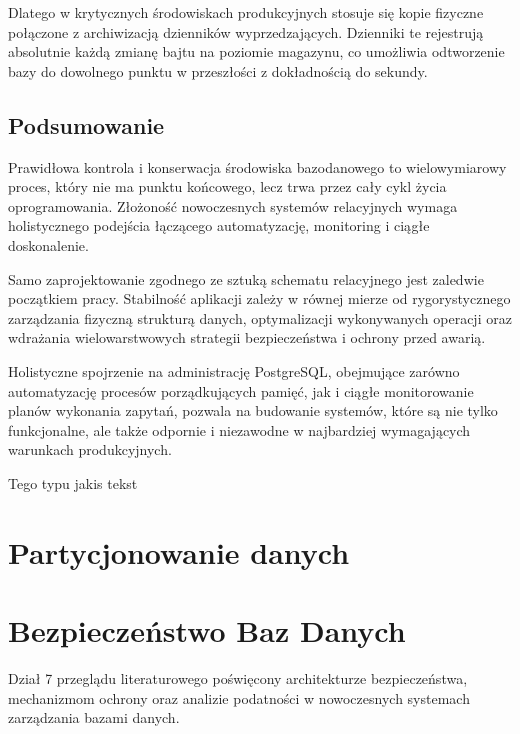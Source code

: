 \documentclass[letterpaper,10pt,english]{sphinxmanual}
\begin{document}
\sphinxAtStartPar
Dlatego w krytycznych środowiskach produkcyjnych stosuje się kopie fizyczne połączone z archiwizacją dzienników wyprzedzających. Dzienniki te rejestrują absolutnie każdą zmianę bajtu na poziomie magazynu, co umożliwia odtworzenie bazy do dowolnego punktu w przeszłości z dokładnością do sekundy.


\subsection{Podsumowanie}
\label{\detokenize{rozdzial_2/rozdzial_23/index:podsumowanie}}
\sphinxAtStartPar
Prawidłowa kontrola i konserwacja środowiska bazodanowego to wielowymiarowy proces, który nie ma punktu końcowego, lecz trwa przez cały cykl życia oprogramowania. Złożoność nowoczesnych systemów relacyjnych wymaga holistycznego podejścia łączącego automatyzację, monitoring i ciągłe doskonalenie.

\sphinxAtStartPar
Samo zaprojektowanie zgodnego ze sztuką schematu relacyjnego jest zaledwie początkiem pracy. Stabilność aplikacji zależy w równej mierze od rygorystycznego zarządzania fizyczną strukturą danych, optymalizacji wykonywanych operacji oraz wdrażania wielowarstwowych strategii bezpieczeństwa i ochrony przed awarią.

\sphinxAtStartPar
Holistyczne spojrzenie na administrację PostgreSQL, obejmujące zarówno automatyzację procesów porządkujących pamięć, jak i ciągłe monitorowanie planów wykonania zapytań, pozwala na budowanie systemów, które są nie tylko funkcjonalne, ale także odpornie i niezawodne w najbardziej wymagających warunkach produkcyjnych.

\sphinxstepscope

\sphinxAtStartPar
Tego typu jakis tekst

\sphinxstepscope


\section{Partycjonowanie danych}
\label{\detokenize{rozdzial_2/rozdzial_26/index:partycjonowanie-danych}}\label{\detokenize{rozdzial_2/rozdzial_26/index::doc}}
\sphinxstepscope


\section{Bezpieczeństwo Baz Danych}
\label{\detokenize{rozdzial_2/rozdzial_27/index:bezpieczenstwo-baz-danych}}\label{\detokenize{rozdzial_2/rozdzial_27/index::doc}}
\sphinxAtStartPar
Dział 7 przeglądu literaturowego poświęcony architekturze bezpieczeństwa, mechanizmom ochrony oraz analizie podatności w nowoczesnych systemach zarządzania bazami danych.
\end{document}
